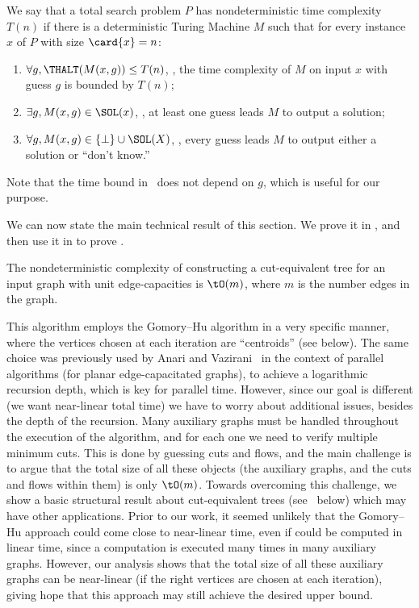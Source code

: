 \begin{definition}
We say that a total search problem $P$ has nondeterministic time complexity $T(n)$ if there is a deterministic Turing Machine $M$ such that for every instance $x$ of $P$ with size $\card{x}=n$:
\begin{enumerate}
\item \label{it:time}
  $\forall g, \THALT(M(x,g))\leq T(n)$,
  \ie, the time complexity of $M$ on input $x$ with guess $g$ is bounded by $T(n)$;
\item \label{it:a}
  $\exists g, M(x,g)\in \SOL(x)$, \ie, at least one guess leads $M$ to output a solution;
\item \label{it:b}
  $\forall g, M(x,g) \in \{\bot\}\cup \SOL(X)$, \ie, every guess leads $M$ to output either a solution or ``don't know.''
\end{enumerate}
Note that the time bound in~ does not depend on $g$, which is useful for our purpose.
\end{definition}

We can now state the main technical result of this section.
We prove it in ,
and then use it in  to prove .

\begin{theorem}\label{nondet:main}
The nondeterministic complexity of constructing a cut-equivalent tree
  for an input graph with unit edge-capacities is $\tO(m)$,
  where $m$ is the number edges in the graph.
\end{theorem}

This algorithm employs the Gomory--Hu algorithm in a very specific manner,
where the vertices chosen at each iteration are ``centroids'' (see below).
The same choice was previously used by Anari and Vazirani~\cite{AnariV18}
in the context of parallel algorithms (for planar edge-capacitated graphs),
to achieve a logarithmic recursion depth, which is key for parallel time.
However, since our goal is different (we want near-linear total time) we have to worry about additional issues, besides the depth of the recursion.
Many auxiliary graphs must be handled throughout the execution of the algorithm, and for each one we need to verify multiple minimum cuts.
This is done by guessing cuts and flows, and the main challenge is to argue that the total size of all these objects (the auxiliary graphs, and the cuts and flows within them) is only $\tO(m)$.
Towards overcoming this challenge, we show a basic structural result about cut-equivalent trees (see~ below) which may have other applications.
Prior to our work, it seemed unlikely that the Gomory--Hu approach could come close to near-linear time, even if \MF could be computed in linear time, since a \MF computation is executed many times in many auxiliary graphs.
However, our analysis shows that the total size of all these auxiliary graphs can be near-linear (if the right vertices are chosen at each iteration),
giving hope that this approach may still achieve the desired upper bound.

